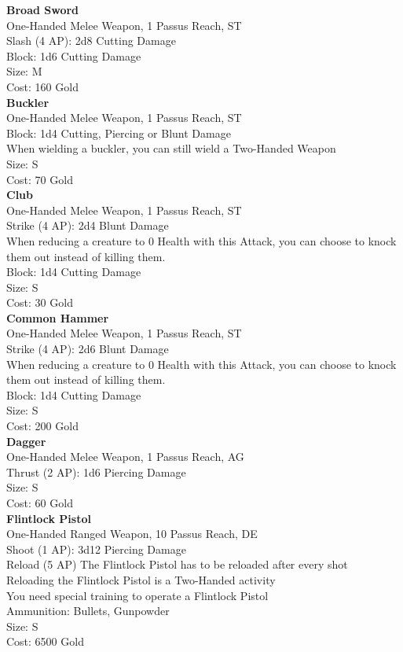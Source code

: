 \textbf{Broad Sword}\\
One-Handed Melee Weapon, 1 Passus Reach, ST\\
Slash (4 AP): 2d8 Cutting Damage\\
Block: 1d6 Cutting Damage\\
Size: M\\
Cost: 160 Gold\\


\textbf{Buckler}\\
One-Handed Melee Weapon, 1 Passus Reach, ST\\
Block: 1d4 Cutting, Piercing or Blunt Damage\\
When wielding a buckler, you can still wield a Two-Handed Weapon\\
Size: S\\
Cost: 70 Gold\\


\textbf{Club}\\
One-Handed Melee Weapon, 1 Passus Reach, ST\\
Strike (4 AP): 2d4 Blunt Damage\\
When reducing a creature to 0 Health with this Attack, you can choose to knock them out instead of killing them.\\
Block: 1d4 Cutting Damage\\
Size: S\\
Cost: 30 Gold\\


\textbf{Common Hammer}\\
One-Handed Melee Weapon, 1 Passus Reach, ST\\
Strike (4 AP): 2d6 Blunt Damage\\
When reducing a creature to 0 Health with this Attack, you can choose to knock them out instead of killing them.\\
Block: 1d4 Cutting Damage\\
Size: S\\
Cost: 200 Gold\\


\textbf{Dagger}\\
One-Handed Melee Weapon, 1 Passus Reach, AG\\
Thrust (2 AP): 1d6 Piercing Damage\\
Size: S\\
Cost: 60 Gold\\


\textbf{Flintlock Pistol}\\
One-Handed Ranged Weapon, 10 Passus Reach, DE\\
Shoot (1 AP): 3d12 Piercing Damage\\
Reload (5 AP) The Flintlock Pistol has to be reloaded after every shot\\
Reloading the Flintlock Pistol is a Two-Handed activity\\
You need special training to operate a Flintlock Pistol\\
Ammunition: Bullets, Gunpowder\\
Size: S\\
Cost: 6500 Gold\\


